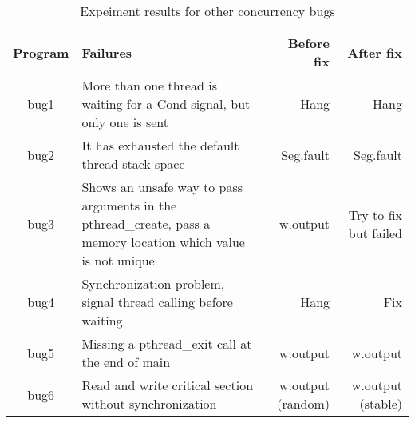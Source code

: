 \begin{table*}[htbp]
  \centering
\begin{tabular}{|c|p{7cm}|r|r|} \hline
  Program & Failures & Before fix & After fix \\ \hline
  bug1 & More than one thread is waiting for a Cond signal, but only one is sent & Hang & Hang \\ \hline
  bug2 & It has exhausted the default thread stack space & Seg.fault & Seg.fault \\ \hline
  bug3 & Shows an unsafe way to pass arguments in the pthread\_create, pass a memory location which value is not unique & w.output & Try to fix but failed \\ \hline
  bug4 & Synchronization problem,  signal thread calling before waiting & Hang & Fix \\ \hline
  bug5 & Missing a pthread\_exit call at the end of main & w.output & w.output \\ \hline
  bug6 & Read and write critical section without synchronization & w.output (random) & w.output (stable) \\ \hline
\end{tabular}%
\caption{Expeiment results for other concurrency bugs}
\label{tab:other}%
\end{table*}%
